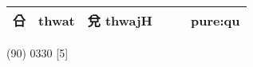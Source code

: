 \documentclass[14pt,a4paper]{scrartcl}
\begin{document}
\begin{longtable}[c]{@{}llllll@{}}
\begin{minipage}[t]{0.14\columnwidth}\raggedright\strut
㕣
\strut\end{minipage} &
\begin{minipage}[t]{0.14\columnwidth}\raggedright\strut
thwat
\strut\end{minipage} &
\begin{minipage}[t]{0.14\columnwidth}\raggedright\strut
兌 thwajH
\strut\end{minipage} &
\begin{minipage}[t]{0.14\columnwidth}\raggedright\strut
\strut\end{minipage} &
\begin{minipage}[t]{0.14\columnwidth}\raggedright\strut
\strut\end{minipage} &
\begin{minipage}[t]{0.14\columnwidth}\raggedright\strut
pure:qu
\strut\end{minipage}\tabularnewline
\bottomrule
\end{longtable}

(90) 0330 {[}5{]}
\end{document}
